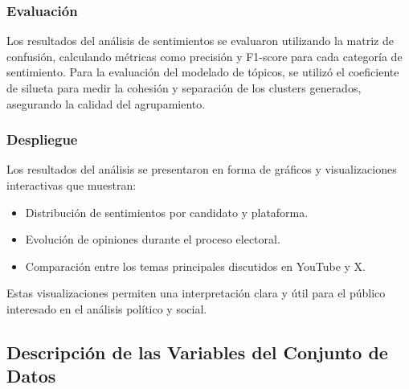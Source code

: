 \documentclass[10pt, a4paper]{article}
\begin{document}
	\subsubsection{Evaluación}
	Los resultados del análisis de sentimientos se evaluaron utilizando la matriz de confusión, calculando métricas como precisión y F1-score para cada categoría de sentimiento. Para la evaluación del modelado de tópicos, se utilizó el coeficiente de silueta para medir la cohesión y separación de los clusters generados, asegurando la calidad del agrupamiento.
	
	\subsubsection{Despliegue}
	Los resultados del análisis se presentaron en forma de gráficos y visualizaciones interactivas que muestran:
	\begin{itemize}
		\item Distribución de sentimientos por candidato y plataforma.
		\item Evolución de opiniones durante el proceso electoral.
		\item Comparación entre los temas principales discutidos en YouTube y X.
	\end{itemize}
	Estas visualizaciones permiten una interpretación clara y útil para el público interesado en el análisis político y social.
	
	
	\subsection{Descripción de las Variables del Conjunto de Datos}
	
\end{document}
